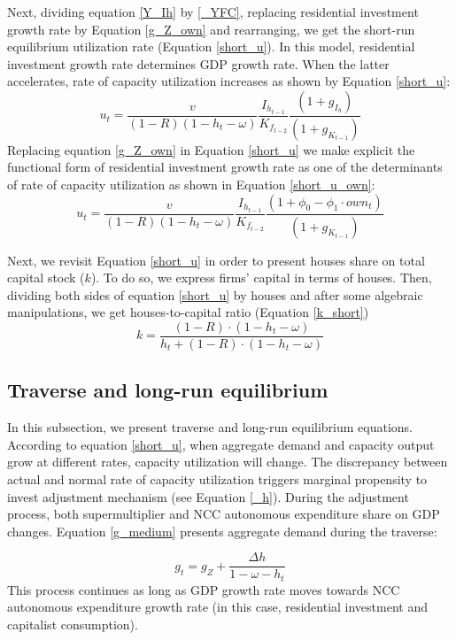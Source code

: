 \documentclass[12pt]{article}
\begin{document}
Next, dividing equation \ref{Y_Ih} by \ref{_YFC},  replacing residential investment growth rate by Equation \ref{g_Z_own}  and rearranging, we get the short-run equilibrium utilization rate (Equation \ref{short_u}).
In this model, residential investment growth rate determines GDP growth rate.
When the latter accelerates, rate of capacity utilization increases as shown by Equation \ref{short_u}:
\begin{equation}
\label{short_u}
u_t = \frac{v}{(1-R)(1-h_t - \omega)}\frac{I_{h_{t-1}}}{K_{f_{t-2}}}\frac{(1 + g_{I_h})}{(1+g_{K_{t-1}})}
\end{equation}
Replacing equation \ref{g_Z_own} in Equation \ref{short_u} we make explicit the functional form of residential investment growth rate as one of the determinants of rate of capacity utilization as shown in Equation \ref{short_u_own}:
\begin{equation}
\label{short_u_own}
u_t = \frac{v}{(1-R)(1-h_t - \omega)}\frac{I_{h_{t-1}}}{K_{f_{t-2}}}\frac{(1 + \phi_0 - \phi_1\cdot own_t)}{(1+g_{K_{t-1}})}
\end{equation}

Next, we revisit Equation \ref{short_u} in order to present houses share on total capital stock (\(k\)).
To do so, we express firms' capital in terms of houses. 
Then, dividing both sides of equation \ref{short_u} by houses and after some algebraic manipulations, we get houses-to-capital ratio (Equation \ref{k_short})
\begin{equation}
\label{k_short}
k = \frac{(1-R)\cdot (1-h_t - \omega)}{h_t + (1-R)\cdot (1-h_t - \omega)}
\end{equation}

\subsection{Traverse and long-run equilibrium}
\label{sec:orgf3c0070}
\label{long}

In this subsection, we present traverse and long-run equilibrium equations.
According to equation \ref{short_u}, when aggregate demand and capacity output grow at different rates, capacity utilization will change. 
The discrepancy between actual and normal rate of capacity utilization triggers marginal propensity to invest adjustment mechanism (see Equation \ref{_h}). 
During the adjustment process, both supermultiplier and NCC autonomous expenditure share on GDP changes.
Equation \ref{g_medium} presents aggregate demand during the traverse:

\begin{equation}
\label{g_medium}
g_t = g_{Z} + \frac{\Delta h}{1 - \omega - h_{t}}
\end{equation}
This process continues as long as GDP growth rate moves towards NCC autonomous expenditure growth rate (in this case, residential investment and capitalist consumption). 
\end{document}
